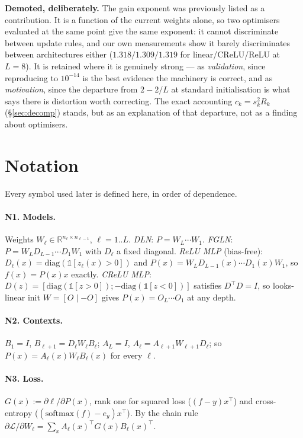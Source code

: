 \documentclass{article}
\newcommand{\NOTE}[1]{{\color{gray}\small #1}}
\theoremstyle{plain}\newtheorem{theorem}{Theorem}\newtheorem{lemma}[theorem]{Lemma}
\theoremstyle{definition}\newtheorem{definition}[theorem]{Definition}
\newcommand{\R}{\mathbb{R}}\newcommand{\dW}{\Delta W}\newcommand{\Jop}{J}
\begin{document}
\NOTE{\textbf{Demoted, deliberately.} The gain exponent was previously listed as a contribution. It
is a function of the current weights alone, so two optimisers evaluated at the same point give the
same exponent: it cannot discriminate between update rules, and our own measurements show it barely
discriminates between architectures either ($1.318/1.309/1.319$ for linear/CReLU/ReLU at $L{=}8$).
It is retained where it is genuinely strong --- as \emph{validation}, since reproducing
\cite{arora2018optimization} to $10^{-14}$ is the best evidence the machinery is correct, and as
\emph{motivation}, since the departure from $2-2/L$ at standard initialisation is what says there
is distortion worth correcting. The exact accounting $c_k=s_k^2R_k$ (\S\ref{sec:decomp}) stands,
but as an explanation of that departure, not as a finding about optimisers.}

\section{Notation}\label{sec:notation}

\NOTE{Every symbol used later is defined here, in order of dependence.}

\paragraph{N1. Models.} Weights $W_\ell\in\R^{n_\ell\times n_{\ell-1}}$, $\ell=1..L$.
\emph{DLN}: $P=W_L\cdots W_1$. \emph{FGLN}: $P=W_LD_{L-1}\cdots D_1W_1$ with $D_\ell$ a fixed
diagonal. \emph{ReLU MLP} (bias-free): $D_\ell(x)=\mathrm{diag}(\mathbb 1[z_\ell(x)>0])$ and
$P(x)=W_LD_{L-1}(x)\cdots D_1(x)W_1$, so $f(x)=P(x)x$ exactly. \emph{CReLU MLP}:
$D(z)=[\mathrm{diag}(\mathbb 1[z>0]);-\mathrm{diag}(\mathbb 1[z<0])]$ satisfies $D^\top D=I$, so
looks-linear init $W=[O\mid-O]$ gives $P(x)=O_L\cdots O_1$ at any depth.

\paragraph{N2. Contexts.} $B_1=I$, $B_{\ell+1}=D_\ell W_\ell B_\ell$; $A_L=I$,
$A_\ell=A_{\ell+1}W_{\ell+1}D_\ell$; so $P(x)=A_\ell(x)W_\ell B_\ell(x)$ for every $\ell$.

\paragraph{N3. Loss.} $G(x):=\partial\ell/\partial P(x)$, rank one for squared loss
($(f-y)x^\top$) and cross-entropy ($(\mathrm{softmax}(f)-e_y)x^\top$). By the chain rule
$\partial\mathcal L/\partial W_\ell=\sum_x A_\ell(x)^\top G(x)B_\ell(x)^\top$.
\end{document}
